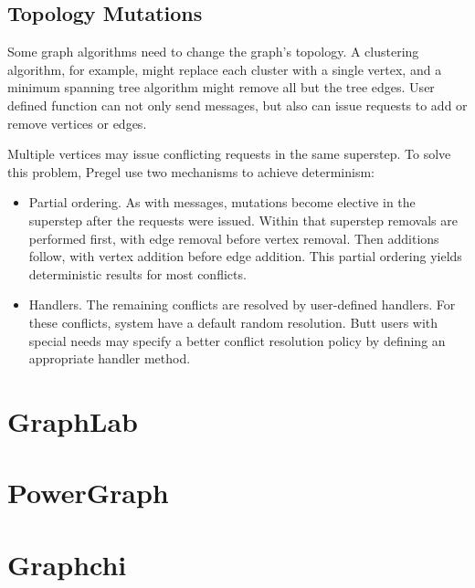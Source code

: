 \documentclass {report}
\begin{document}
\subsection{Topology Mutations}
Some graph algorithms need to change the graph's topology. A clustering algorithm, for example, might replace each
cluster with a single vertex, and a minimum spanning tree
algorithm might remove all but the tree edges. User defined function can not only send messages, but also can 
issue requests to add or remove vertices or edges.


Multiple vertices may issue conflicting requests in the same
superstep. To solve this problem, Pregel use two mechanisms to achieve
determinism: 
\begin{itemize}
  \item Partial ordering. As with messages, mutations become elective in the superstep after the requests were
  issued. Within that superstep removals are performed first, with edge removal before vertex removal. Then additions follow, with vertex addition before edge addition. This partial ordering yields deterministic results for most conflicts.
  \item Handlers. The remaining conflicts are resolved by user-defined handlers. For these conflicts, system have a default random resolution. Butt users with special needs may specify a better conflict resolution policy by defining an appropriate handler method.
\end{itemize}

\section{GraphLab}
\section{PowerGraph}
\section{Graphchi}
\end{document}
